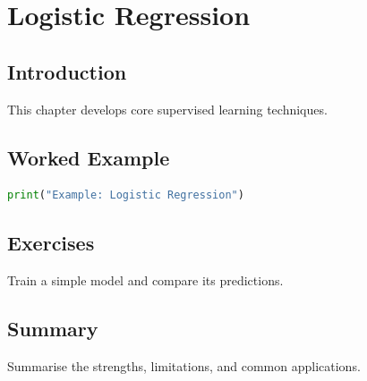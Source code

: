 \chapter{Logistic Regression}
\label{chap:vol6-7}



\section{Introduction}
This chapter develops core supervised learning techniques.

\section{Worked Example}
\begin{lstlisting}[language=Python]
print("Example: Logistic Regression")
\end{lstlisting}

\section{Exercises}
\begin{exercise}
Train a simple model and compare its predictions.
\end{exercise}

\section{Summary}
Summarise the strengths, limitations, and common applications.
